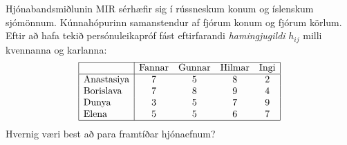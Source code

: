 \begin{daemi}[Giftingar]\label{daemi:gifting}Hjónabandsmiðlunin \textsc{MIR} sérhæfir sig í rússneskum konum og íslenskum sjómönnum. Kúnnahópurinn saman\-stendur af fjórum konum og fjórum körlum. Eftir að hafa tekið persónuleikapróf fást eftir\-farandi \emph{hamingjugildi} $h_{ij}$ milli kvennanna og karlanna:
\[ \begin{array}{|l|cccc|}\hline & \textrm{Fannar} & \textrm{Gunnar} & \textrm{Hilmar} & \textrm{Ingi} \\ \hline
    \textrm{Anastasiya}  & 7 & 5 & 8 & 2 \\
    \textrm{Borislava} & 7 & 8 & 9 & 4 \\
    \textrm{Dunya} & 3 & 5 & 7 & 9 \\
    \textrm{Elena} & 5 & 5 & 6 & 7 \\ \hline 
   \end{array}\]
Hvernig væri best að para framtíðar hjónaefnum? 
\end{daemi}
